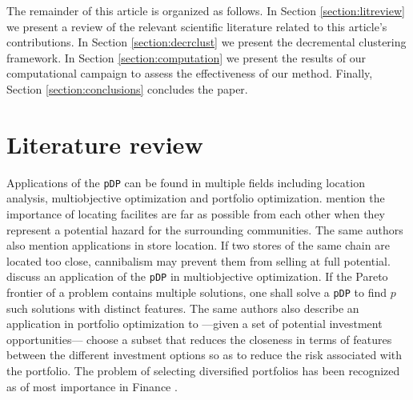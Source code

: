 \documentclass[a4paper,10pt]{article}
\newcommand{\pDP}{\texttt{pDP}}
\begin{document}
The remainder of this article is organized as follows. In Section \ref{section:litreview} we present a review of the relevant scientific literature related to this article's contributions. In Section \ref{section:decrclust} we present the decremental clustering framework. In Section \ref{section:computation} we present the results of our computational campaign to assess the effectiveness of our method. Finally, Section \ref{section:conclusions} concludes the paper.

\section{Literature review\label{section:litreview}}

Applications of the \pDP{} can be found in multiple fields including location analysis, multiobjective optimization and portfolio optimization. \citet{Kuby1987Programming} mention the importance of locating facilites are far as possible from each other when they represent a potential hazard for the surrounding communities. The same authors also mention applications in store location. If two stores of the same chain are located too close, cannibalism may prevent them from selling at full potential. \citet{Saboonchi2014MaxMinMin} discuss an application of the \pDP{} in multiobjective optimization. If the Pareto frontier of a problem contains multiple solutions, one shall solve a \pDP{} to find $p$ such solutions with distinct features. The same authors also describe an application in portfolio optimization to ---given a set of potential investment opportunities--- choose a subset that reduces the closeness in terms of features between the different investment options so as to reduce the risk associated with the portfolio. The problem of selecting diversified portfolios has been recognized as of most importance in Finance \citep{Statman1987how}.

\end{document}

